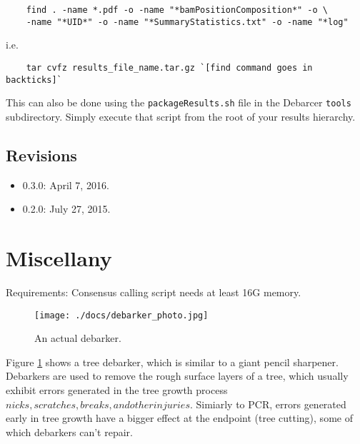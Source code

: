 \documentclass{article}
\begin{document}
\begin{verbatim}
	find . -name *.pdf -o -name "*bamPositionComposition*" -o \
	-name "*UID*" -o -name "*SummaryStatistics.txt" -o -name "*log"
\end{verbatim}

i.e.

\begin{verbatim}
	tar cvfz results_file_name.tar.gz `[find command goes in backticks]`
\end{verbatim}

This can also be done using the \texttt{packageResults.sh} file
in the Debarcer \texttt{tools} subdirectory. Simply execute that
script from the root of your results hierarchy.

\subsection{Revisions}

\begin{itemize}
  \item 0.3.0:  April 7, 2016. 
  \item 0.2.0:  July 27, 2015.
\end{itemize}

\section{Miscellany}

Requirements:  Consensus calling script needs at least 16G memory.

\begin{figure}[h!]
  \centering
  \texttt{[image: ./docs/debarker\_photo.jpg]}
  \caption{An actual debarker.}
  \label{fig:debarker1}
\end{figure}

Figure \ref{fig:debarker1} shows a tree debarker, which is similar to 
a giant pencil sharpener. Debarkers are used to remove the rough surface layers 
of a tree, which usually exhibit errors generated in the tree growth process \(nicks,
scratches, breaks, and other injuries\). Simiarly to PCR, errors generated early in tree
growth have a bigger effect at the endpoint (tree cutting), some of which
debarkers can't repair.
\end{document}
